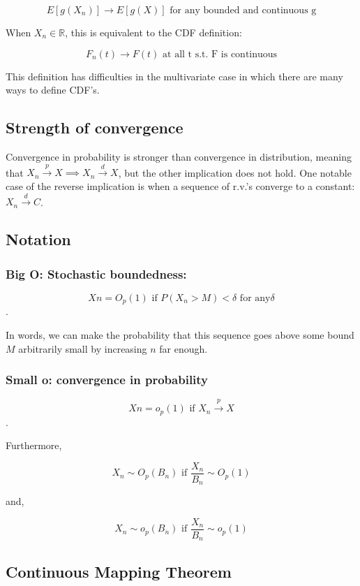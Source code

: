 \documentclass[aos,preprint]{imsart}
\numberwithin{equation}{section}
\theoremstyle{plain}
\begin{document}
$$ E[g(X_n)] \rightarrow E[g(X)] \text{ for any bounded and continuous g} $$

When $ X_n \in \mathbb{R} $, this is equivalent to the CDF definition: 

$$ F_n(t) \rightarrow F(t) \text{ at all t s.t. F is continuous}$$ 

This definition has difficulties in the multivariate case in which there are many ways to define CDF's. 

\subsection{Strength of convergence}

Convergence in probability is stronger than convergence in distribution, meaning that ${{X_n}} \xrightarrow{p} X  \implies {{X_n}} \xrightarrow{d} X $, but the other implication does not hold. One  notable case of the reverse implication is when a sequence of r.v.'s converge to a constant:  $ {{X_n}} \xrightarrow{d} C $. 

\subsection{Notation}

\subsubsection{Big O: Stochastic boundedness: }


$$ Xn = O_p(1) \text{ if } P(X_n >M) < \delta \text{ for any} \delta $$. 

In words, we can make the probability that this sequence goes above some bound $M$ arbitrarily small by increasing $n$ far enough. 

\subsubsection{Small o: convergence in probability}

$$ Xn = o_p(1) \text{ if } {{X_n}} \xrightarrow{p} X $$. 

Furthermore, 

$$ X_n \sim O_p(B_n) \text{  if  } \frac{X_n}{B_n} \sim O_p(1) $$

and, 

$$ X_n \sim o_p(B_n) \text{  if  } \frac{X_n}{B_n} \sim o_p(1) $$

\subsection{Continuous Mapping Theorem}
\end{document}
